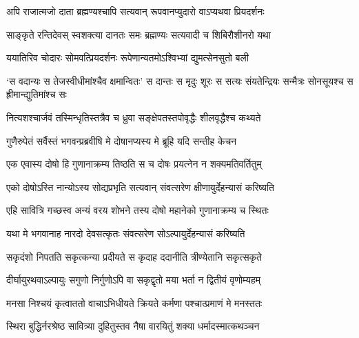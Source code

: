 \twolineshloka
{अपि राजात्मजो दाता ब्रह्मण्यश्चापि सत्यवान्}
{रूपवानप्युदारो वाऽप्यथवा प्रियदर्शनः}




\twolineshloka
{साङ्कृते रन्तिदेवस् स्वशक्त्या दानतः समः}
{ब्रह्मण्यः सत्यवादी च शिबिरौशीनरो यथा}


\twolineshloka
{ययातिरिव चोदारः सोमवत्प्रियदर्शनः}
{रूपेणान्यतमोऽश्विभ्यां द्युमत्सेनसुतो बली}


\threelineshloka
{`स वदान्यः स तेजस्वीधीमांश्चैव क्षमान्वितः'}
{स दान्तः स मृदुः शूरः स सत्यः संयतेन्द्रियः}
{सन्मैत्रः सोनसूयश्च स ह्रीमान्द्युतिमांश्च सः}


\twolineshloka
{नित्यशश्चार्जवं तस्मिन्धृतिस्तत्रैव च ध्रुवा}
{सङ्क्षेपतस्तपोवृद्धैः शीलवृद्धैश्च कथ्यते}




\twolineshloka
{गुणैरुपेतं सर्वैस्तं भगवन्प्रब्रवीषि मे}
{दोषानप्यस्य मे ब्रूहि यदि सन्तीह केचन}




\twolineshloka
{एक एवास्य दोषो हि गुणानाक्रम्य तिष्ठति}
{स च दोषः प्रयत्नेन न शक्यमतिवर्तितुम्}


\twolineshloka
{एको दोषोऽस्ति नान्योऽस्य सोद्यप्रभृति सत्यवान्}
{संवत्सरेण क्षीणायुर्देहन्यासं करिष्यति}




\twolineshloka
{एहि सावित्रि गच्छस्व अन्यं वरय शोभने}
{तस्य दोषो महानेको गुणानाक्रम्य च स्थितः}


\twolineshloka
{यथा मे भगवानाह नारदो देवसत्कृतः}
{संवत्सरेण सोऽल्पायुर्देहन्यासं करिष्यति}




\twolineshloka
{सकृदंशो निपतति सकृत्कन्या प्रदीयते}
{स कृदाह ददानीति त्रीण्येतानि सकृत्सकृते}


\twolineshloka
{दीर्घायुरथवाऽल्पायुः सगुणो निर्गुणोऽपि वा}
{सकृद्वृतो मया भर्ता न द्वितीयं वृणोम्यहम्}


\twolineshloka
{मनसा निश्चयं कृत्वाततो वाचाऽभिधीयते}
{क्रियते कर्मणा पश्चात्प्रमाणं मे मनस्ततः}




\twolineshloka
{स्थिरा बुद्धिर्नरश्रेष्ठ सावित्र्या दुहितुस्तव}
{नैषा वारयितुं शक्या धर्मादस्मात्कथञ्चन}


